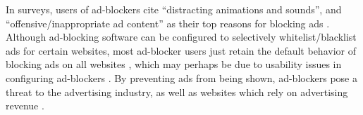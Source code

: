 \documentclass{sigchi}
\begin{document}
In surveys, users of ad-blockers cite ``distracting animations and sounds'', and ``offensive/inappropriate ad content'' as their top reasons for blocking ads \cite{adblockinggames}. Although ad-blocking software can be configured to selectively whitelist/blacklist ads for certain websites, most ad-blocker users just retain the default behavior of blocking ads on all websites \cite{adblockinggames}, which may perhaps be due to usability issues in configuring ad-blockers \cite{adblockusability}. By preventing ads from being shown, ad-blockers pose a threat to the advertising industry, as well as websites which rely on advertising revenue \cite{adblockinggames}. %



\end{document}
